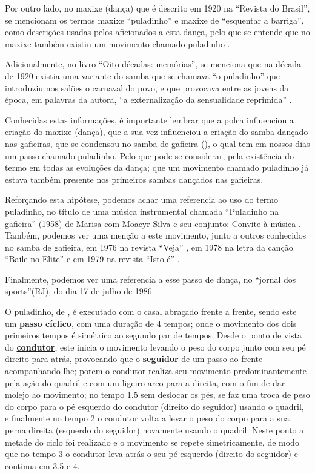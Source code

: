Por outro lado, no maxixe (dança)  que é descrito em 1920 na ``Revista do Brasil'',
se mencionam os termos maxixe ``puladinho'' e maxixe de ``esquentar a barriga'',
como descrições usadas pelos aficionados a esta dança, 
pelo que se entende que no maxixe também existiu um movimento chamado puladinho \cite[pp. 177]{1920revista}. 

Adicionalmente, no livro ``Oito décadas: memórias'', se menciona que na década de
1920 existia uma variante do samba que se chamava ``o puladinho'' 
que introduziu nos salões o carnaval do povo, 
e que provocava entre as jovens da época, em palavras da autora, 
``a externalização da sensualidade reprimida'' \cite[pp. 94-95]{nabuco2000oito}.

Conhecidas estas informações, é importante lembrar que a polca influenciou a criação do maxixe (dança), 
que a sua vez influenciou a criação do samba dançado nas gafieiras,
que se condensou no samba de gafieira (\AnoLivro), o qual tem em nossos dias um passo chamado puladinho. 
Pelo que pode-se considerar, pela existência do termo em todas as evoluções da dança; 
que um movimento chamado puladinho 
já estava também presente nos primeiros sambas dançados nas gafieiras. 

Reforçando esta hipótese, podemos achar uma referencia ao uso do termo puladinho, no título de uma música instrumental chamada 
``Puladinho na gafieira'' (1958)  de  Marisa com Moacyr Silva e seu conjunto: Convite à música \cite{puladinhogafieiramusic}.
Também, podemos ver uma menção a este movimento, junto a outros conhecidos no samba de gafieira,
em 1976 na revista ``Veja'' \cite[pp. 158]{1976veja},
em 1978 na letra da canção ``Baile no Elite'' \cite{BaileNoElite} e 
em 1979 na revista ``Isto é'' \cite[pp. 89]{revista1979isto}.



Finalmente, podemos ver uma referencia a esse passo de dança, no ``jornal dos sports''(RJ),
do dia 17 de julho de 1986 \cite[pp. 6]{gafieiraaredeout2}.


O puladinho, de \AnoLivro, é executado com o casal abraçado frente a frente, sendo este um \hyperref[def:PassoCiclico]{\textbf{passo cíclico}},
com uma duração de 4 tempos; onde o movimento dos dois primeiros tempos
é simétrico ao segundo par de tempos.
Desde o ponto de vista do  \hyperref[def:Condutor]{\textbf{condutor}}, 
este inicia o movimento levando o peso do corpo junto com seu pé direito para atrás, provocando que
o \hyperref[def:Seguidor]{\textbf{seguidor}} de um passo ao frente acompanhando-lhe;
porem o condutor realiza seu movimento predominantemente pela ação do quadril e com um ligeiro arco para a direita, 
com o fim de dar molejo ao movimento;
no tempo 1.5 sem deslocar os pés, 
se faz uma troca de peso do corpo para o pé esquerdo do condutor (direito do seguidor) usando o quadril,
e finalmente no tempo 2 o condutor volta a levar o peso 
do corpo para a sua perna direita (esquerdo do seguidor) novamente usando o quadril.
Neste ponto a metade do ciclo foi realizado e o movimento se repete simetricamente, 
de modo que no tempo 3 o condutor leva atrás o seu pé esquerdo (direito do seguidor) e continua em 3.5 e 4.

